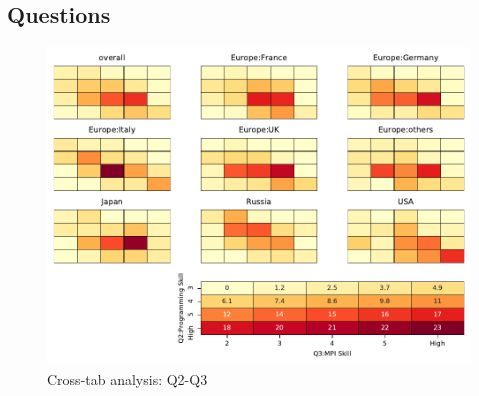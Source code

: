 
\subsection{Questions}


\begin{figure}
\begin{center}
\includegraphics[width=12cm]{../pdfs/Q2-Q3.pdf}
\caption{Cross-tab analysis: Q2-Q3}
\label{fig:Q2-Q3}
\end{center}
\end{figure}
